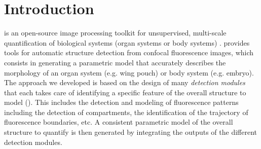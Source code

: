 \section{Introduction}\label{sec:introduction}
\wingj is an open-source image processing toolkit for unsupervised, multi-scale quantification of biological systems (organ systems or body systems) \autocite{schaffter2013}. \wingj provides tools for automatic structure detection from confocal fluorescence images, which consists in generating a parametric model that accurately describes the morphology of an organ system (e.g. \droso wing pouch) or body system (e.g. \droso embryo). The approach we developed is based on the design of many \emph{detection modules} that each takes care of identifying a specific feature of the overall structure to model (). This includes the detection and modeling of fluorescence patterns including the detection of compartments, the identification of the trajectory of fluorescence boundaries, etc. A consistent parametric model of the overall structure to quantify is then generated by integrating the outputs of the different detection modules.\\

% 

